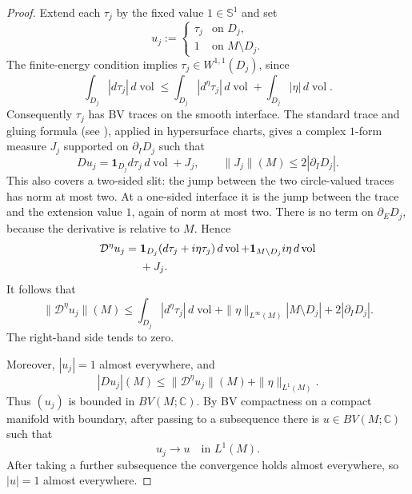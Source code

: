 \documentclass[11pt]{amsart}
\newcommand{\Sph}{\mathbb S^1}
\newcommand{\vol}{\operatorname{vol}}
\begin{document}
\begin{proof}
Extend each $\tau_j$ by the fixed value $1\in\Sph$ and set
\[
 u_j:=
 \begin{cases}
   \tau_j&\text{on }D_j,\\
   1&\text{on }M\setminus D_j.
 \end{cases}
\]
The finite-energy condition implies $\tau_j\in W^{1,1}(D_j)$, since
\[
 \int_{D_j}|d\tau_j|\,d\vol
 \leq \int_{D_j}|d^\eta\tau_j|\,d\vol
       +\int_{D_j}|\eta|\,d\vol.
\]
Consequently $\tau_j$ has BV traces on the smooth interface.  The standard
trace and gluing formula (see \cite{AFP}), applied in hypersurface charts,
gives a complex $1$-form measure $J_j$ supported on $\partial_I D_j$ such that
\[
 Du_j=\boldsymbol 1_{D_j}d\tau_j\,d\vol+J_j,
 \qquad
 \|J_j\|(M)\leq2|\partial_I D_j|.
\]
This also covers a two-sided slit: the jump between the two circle-valued
traces has norm at most two.  At a one-sided interface it is the jump between
the trace and the extension value $1$, again of norm at most two.
There is no term on $\partial_E D_j$, because the derivative is relative to
$M$.  Hence
\begin{align}
 \mathcal D^\eta u_j
  ={}&\boldsymbol 1_{D_j}(d\tau_j+i\eta\tau_j)\,d\vol
      +\boldsymbol 1_{M\setminus D_j}i\eta\,d\vol \notag\\
    &+J_j.                                                \label{eq:measure}
\end{align}
It follows that
\begin{equation}
 \|\mathcal D^\eta u_j\|(M)
 \leq
 \int_{D_j}|d^\eta\tau_j|\,d\vol
 +\|\eta\|_{L^\infty(M)}|M\setminus D_j|
 +2|\partial_I D_j|.
 \label{eq:key-estimate}
\end{equation}
The right-hand side tends to zero.

Moreover, $|u_j|=1$ almost everywhere, and
\[
 |Du_j|(M)
 \leq \|\mathcal D^\eta u_j\|(M)+\|\eta\|_{L^1(M)}.
\]
Thus $(u_j)$ is bounded in $BV(M;\mathbb C)$.  By BV compactness on a compact
manifold with boundary, after passing to a subsequence there is
$u\in BV(M;\mathbb C)$ such that
\[
 u_j\longrightarrow u\quad\text{in }L^1(M).
\]
After taking a further subsequence the convergence holds almost everywhere,
so $|u|=1$ almost everywhere.


\end{proof}
\end{document}
